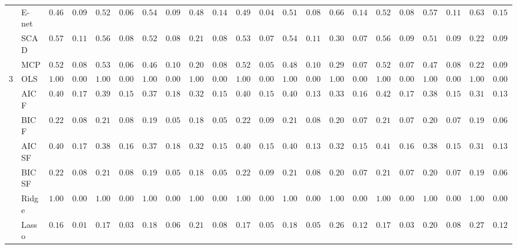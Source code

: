 \begin{tabular}{ll|ll|llllll|llllll|llllll}
 & E-net  & $0.4633$ & $0.0905$ & $0.5200$ & $0.0639$ & $0.5400$ & $0.0921$ & $0.4867$ & $0.1492$ & $0.4917$ & $0.0435$ & $0.5167$ & $0.0870$ & $0.6600$ & $0.1400$ & $0.5217$ & $0.0843$ & $0.5700$ & $0.1141$ & $0.6300$ & $0.1599$ \\
 & SCAD  & $0.5733$ & $0.1168$ & $0.5617$ & $0.0875$ & $0.5217$ & $0.0843$ & $0.2100$ & $0.0874$ & $0.5383$ & $0.0780$ & $0.5433$ & $0.1127$ & $0.3017$ & $0.0775$ & $0.5600$ & $0.0963$ & $0.5167$ & $0.0991$ & $0.2217$ & $0.0978$ \\
 & MCP  & $0.5250$ & $0.0833$ & $0.5333$ & $0.0670$ & $0.4650$ & $0.1093$ & $0.2033$ & $0.0806$ & $0.5200$ & $0.0594$ & $0.4850$ & $0.1088$ & $0.2950$ & $0.0744$ & $0.5217$ & $0.0773$ & $0.4783$ & $0.0875$ & $0.2233$ & $0.0954$ \\\hline
3 & OLS  & $1.0000$ & $0.0000$ & $1.0000$ & $0.0000$ & $1.0000$ & $0.0000$ & $1.0000$ & $0.0000$ & $1.0000$ & $0.0000$ & $1.0000$ & $0.0000$ & $1.0000$ & $0.0000$ & $1.0000$ & $0.0000$ & $1.0000$ & $0.0000$ & $1.0000$ & $0.0000$ \\
 & AIC F  & $0.4083$ & $0.1714$ & $0.3917$ & $0.1596$ & $0.3700$ & $0.1813$ & $0.3250$ & $0.1505$ & $0.4050$ & $0.1594$ & $0.4083$ & $0.1389$ & $0.3317$ & $0.1650$ & $0.4200$ & $0.1700$ & $0.3800$ & $0.1573$ & $0.3133$ & $0.1387$ \\
 & BIC F  & $0.2267$ & $0.0871$ & $0.2183$ & $0.0877$ & $0.1900$ & $0.0581$ & $0.1850$ & $0.0524$ & $0.2200$ & $0.0944$ & $0.2183$ & $0.0810$ & $0.2083$ & $0.0799$ & $0.2133$ & $0.0789$ & $0.2067$ & $0.0790$ & $0.1983$ & $0.0657$ \\
 & AIC SF  & $0.4083$ & $0.1714$ & $0.3883$ & $0.1608$ & $0.3700$ & $0.1813$ & $0.3250$ & $0.1505$ & $0.4017$ & $0.1573$ & $0.4083$ & $0.1389$ & $0.3200$ & $0.1529$ & $0.4167$ & $0.1667$ & $0.3800$ & $0.1591$ & $0.3117$ & $0.1395$ \\
 & BIC SF  & $0.2267$ & $0.0871$ & $0.2183$ & $0.0877$ & $0.1900$ & $0.0581$ & $0.1850$ & $0.0524$ & $0.2200$ & $0.0944$ & $0.2183$ & $0.0810$ & $0.2083$ & $0.0799$ & $0.2133$ & $0.0789$ & $0.2067$ & $0.0790$ & $0.1983$ & $0.0657$ \\
 & Ridge  & $1.0000$ & $0.0000$ & $1.0000$ & $0.0000$ & $1.0000$ & $0.0000$ & $1.0000$ & $0.0000$ & $1.0000$ & $0.0000$ & $1.0000$ & $0.0000$ & $1.0000$ & $0.0000$ & $1.0000$ & $0.0000$ & $1.0000$ & $0.0000$ & $1.0000$ & $0.0000$ \\
 & Lasso  & $0.1683$ & $0.0167$ & $0.1717$ & $0.0371$ & $0.1883$ & $0.0697$ & $0.2183$ & $0.0844$ & $0.1767$ & $0.0571$ & $0.1800$ & $0.0512$ & $0.2683$ & $0.1273$ & $0.1767$ & $0.0398$ & $0.2033$ & $0.0873$ & $0.2717$ & $0.1223$ \\

\end{tabular}
